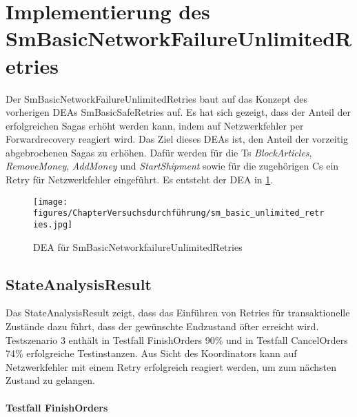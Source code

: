 \section{Implementierung des SmBasicNetworkFailureUnlimitedRetries}

Der SmBasicNetworkFailureUnlimitedRetries baut auf das Konzept des vorherigen DEAs SmBasicSafeRetries auf. Es hat sich gezeigt, dass der Anteil der erfolgreichen Sagas erhöht werden kann, indem auf Netzwerkfehler per Forwardrecovery reagiert wird. Das Ziel dieses DEAs ist, den Anteil der vorzeitig abgebrochenen Sagas zu erhöhen. Dafür werden für die Ts \textit{BlockArticles}, \textit{RemoveMoney}, \textit{AddMoney} und \textit{StartShipment} sowie für die zugehörigen Cs ein Retry für Netzwerkfehler eingeführt. Es entsteht der DEA in \cref{fig:SmBasicNetworkfailureUnlimitedRetries}.

\begin{figure}[h!]
	\centering
	\texttt{[image: figures/ChapterVersuchsdurchführung/sm\_basic\_unlimited\_retries.jpg]}
	\caption{DEA für SmBasicNetworkfailureUnlimitedRetries}
	\label{fig:SmBasicNetworkfailureUnlimitedRetries}
\end{figure}
\FloatBarrier

\subsection{StateAnalysisResult}

Das StateAnalysisResult zeigt, dass das Einführen von Retries für transaktionelle Zustände dazu führt, dass der gewünschte Endzustand öfter erreicht wird. Testszenario 3 enthält in Testfall FinishOrders 90\% und in Testfall CancelOrders 74\% erfolgreiche Testinstanzen. Aus Sicht des Koordinators kann auf Netzwerkfehler mit einem Retry erfolgreich reagiert werden, um zum nächsten Zustand zu gelangen.

\paragraph*{Testfall FinishOrders}


